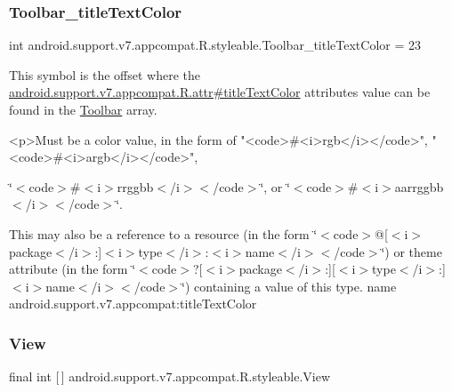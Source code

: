 \subsubsection{\texorpdfstring{Toolbar\+\_\+title\+Text\+Color}{Toolbar\_titleTextColor}}
{\footnotesize\ttfamily int android.\+support.\+v7.\+appcompat.\+R.\+styleable.\+Toolbar\+\_\+title\+Text\+Color = 23\hspace{0.3cm}{\ttfamily [static]}}

This symbol is the offset where the \hyperlink{classandroid_1_1support_1_1v7_1_1appcompat_1_1R_1_1attr_a597dc103e0e2288dfc7bd92d961bc837}{android.\+support.\+v7.\+appcompat.\+R.\+attr\#title\+Text\+Color} attribute\textquotesingle{}s value can be found in the \hyperlink{classandroid_1_1support_1_1v7_1_1appcompat_1_1R_1_1styleable_a2daba9587ef9f700f2d54cf13435cb32}{Toolbar} array.

\begin{DoxyVerb}      <p>Must be a color value, in the form of "<code>#<i>rgb</i></code>", "<code>#<i>argb</i></code>",
\end{DoxyVerb}
 \char`\"{}$<$code$>$\#$<$i$>$rrggbb$<$/i$>$$<$/code$>$\char`\"{}, or \char`\"{}$<$code$>$\#$<$i$>$aarrggbb$<$/i$>$$<$/code$>$\char`\"{}. 

This may also be a reference to a resource (in the form \char`\"{}$<$code$>$@\mbox{[}$<$i$>$package$<$/i$>$\+:\mbox{]}$<$i$>$type$<$/i$>$\+:$<$i$>$name$<$/i$>$$<$/code$>$\char`\"{}) or theme attribute (in the form \char`\"{}$<$code$>$?\mbox{[}$<$i$>$package$<$/i$>$\+:\mbox{]}\mbox{[}$<$i$>$type$<$/i$>$\+:\mbox{]}$<$i$>$name$<$/i$>$$<$/code$>$\char`\"{}) containing a value of this type.  name android.\+support.\+v7.\+appcompat\+:title\+Text\+Color \mbox{\label{classandroid_1_1support_1_1v7_1_1appcompat_1_1R_1_1styleable_a0105bc03f2606ae1fc5f05a515d81b3c}} 
\subsubsection{\texorpdfstring{View}{View}}
{\footnotesize\ttfamily final int \mbox{[}$\,$\mbox{]} android.\+support.\+v7.\+appcompat.\+R.\+styleable.\+View\hspace{0.3cm}{\ttfamily [static]}}

